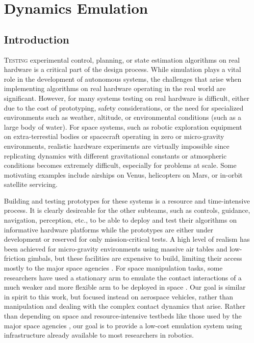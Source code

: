 \documentclass[../root.tex]{subfiles}
\begin{document}
\chapter{Dynamics Emulation} \label{chap:blimp}
\section{Introduction}
\lettrine{T}{esting} experimental control, planning, or state estimation algorithms 
on real hardware is a critical part of the design process. While 
simulation plays a vital role in the development of autonomous systems,
the challenges that arise when implementing algorithms on real hardware
operating in the real world are significant. However, for many systems
testing on real hardware is difficult, either due to the cost of 
prototyping, safety considerations, or the need for specialized 
environments such as weather, altitude, or environmental conditions 
(such as a large body of water). For space systems, such as 
robotic exploration equipment on extra-terrestial bodies or 
spacecraft operating in zero or micro-gravity environments, realistic
hardware experiments are virtually impossible since replicating dynamics
with different gravitational constants or atmospheric conditions becomes
extremely difficult, especially for problems at scale. Some motivating 
examples include airships on Venus, helicopters on Mars, or in-orbit 
satellite servicing.

Building and testing prototypes for these systems is a resource and 
time-intensive process. It is clearly desireable for the other 
subteams, such as controls, guidance, navigation, perception, etc., 
to be able to deploy and test their algorithms on informative hardware
platforms while the prototypes are either under development or reserved 
for only mission-critical tests.  
A high level of realism has been achieved for micro-gravity environments using massive 
air tables and low-friction gimbals, but these facilities are 
expensive to build, limiting their access 
mostly to the major space agencies \cite{schlotterer_Testbed_2012}.
For space manipulation tasks, some researchers have used a stationary 
arm to emulate the contact interactions of a much weaker and more flexible 
arm to be deployed in space \cite{aghili_Contact_2002,aghili_Emulation_2006}.
Our goal is similar in spirit to this work, but focused instead on aerospace
vehicles, rather than manipulation and dealing with the complex contact dynamics
that arise. Rather than depending on space and resource-intensive 
testbeds like those used by the major space agencies \cite{schlotterer_Testbed_2012},
our goal is to provide a low-cost emulation system using infrastructure 
already available to most researchers in robotics.
\end{document}
